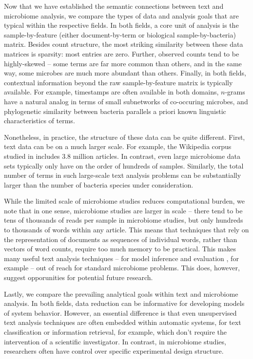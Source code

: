 \documentclass[oupdraft]{bio}
\begin{document}
Now that we have established the semantic connections between text and
microbiome analysis, we compare the types of data and analysis goals that are
typical within the respective fields. In both fields, a core unit of analysis is
the sample-by-feature (either document-by-term or biological sample-by-bacteria)
matrix. Besides count structure, the most striking similarity between these data
matrices is sparsity: most entries are zero. Further, observed counts tend to be
highly-skewed -- some terms are far more common than others, and in the same
way, some microbes are much more abundant than others. Finally, in both fields,
contextual information beyond the raw sample-by-feature matrix is typically
available. For example, timestamps are often available in both domains,
$n$-grams have a natural analog in terms of small subnetworks of co-occuring
microbes, and phylogenetic similarity between bacteria parallels a priori known
linguistic characteristics of terms.

Nonetheless, in practice, the structure of these data can be quite different.
First, text data can be on a much larger scale. For example, the Wikipedia
corpus studied in \citep{hoffman2013stochastic} includes 3.8 million articles.
In contrast, even large microbiome data sets typically only have on the order of
hundreds of samples. Similarly, the total number of terms in such large-scale
text analysis problems can be substantially larger than the number of bacteria
species under consideration.

While the limited scale of microbiome studies reduces computational burden, we
note that in one sense, microbiome studies are larger in scale -- there tend to
be tens of thousands of reads per sample in microbiome studies, but only
hundreds to thousands of words within any article. This means that techniques
that rely on the representation of documents as sequences of individual words,
rather than vectors of word counts, require too much memory to be practical.
This makes many useful text analysis techniques -- for model inference
\citep{griffiths2004finding} and evaluation \citep{wallach2009evaluation}, for
example -- out of reach for standard microbiome problems. This does, however,
suggest opporunities for potential future research.

Lastly, we compare the prevailing analytical goals within text and microbiome
analysis. In both fields, data reduction can be informative for developing
models of system behavior. However, an essential difference is that even
unsupervised text analysis techniques are often embedded within automatic
systems, for text classification or information retrieval, for example, which
don't require the intervention of a scientific investigator. In contrast,
in microbiome studies, researchers often have control over specific experimental
design structure.
\end{document}
